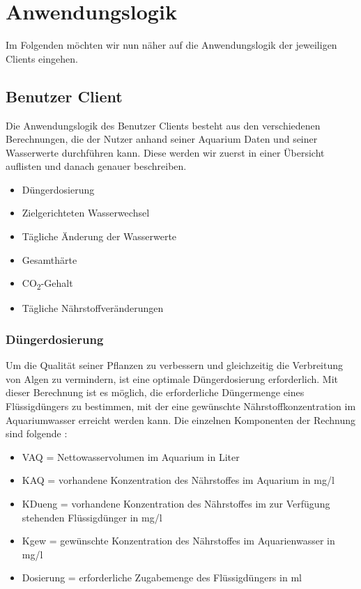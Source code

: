 \section{Anwendungslogik}

Im Folgenden möchten wir nun näher auf die Anwendungslogik der jeweiligen Clients eingehen. 

\subsection{Benutzer Client}

Die Anwendungslogik des Benutzer Clients besteht aus den verschiedenen Berechnungen, die der Nutzer anhand seiner Aquarium Daten und seiner Wasserwerte durchführen kann. Diese werden wir zuerst in einer Übersicht auflisten und danach genauer beschreiben.

\begin{itemize}
\item Düngerdosierung
\item Zielgerichteten Wasserwechsel
\item Tägliche Änderung der Wasserwerte
\item Gesamthärte
\item CO\textsubscript{2}-Gehalt
\item Tägliche Nährstoffveränderungen
\end{itemize}

\subsubsection{Düngerdosierung}

Um die Qualität seiner Pflanzen zu verbessern und gleichzeitig die Verbreitung von Algen zu vermindern, ist eine optimale Düngerdosierung erforderlich. Mit dieser Berechnung ist es möglich, die erforderliche Düngermenge eines Flüssigdüngers zu bestimmen, mit der eine gewünschte Nährstoffkonzentration im Aquariumwasser erreicht werden kann. Die einzelnen Komponenten der Rechnung sind folgende \autocite{Formel:Dosierung}:

\begin{itemize}
\item VAQ = Nettowasservolumen im Aquarium in Liter
\item KAQ = vorhandene Konzentration des Nährstoffes im Aquarium in mg/l
\item KDueng = vorhandene Konzentration des Nährstoffes im zur Verfügung stehenden Flüssigdünger in mg/l
\item Kgew = gewünschte Konzentration des Nährstoffes im Aquarienwasser in mg/l
\item Dosierung = erforderliche Zugabemenge des Flüssigdüngers in ml
\end{itemize}


